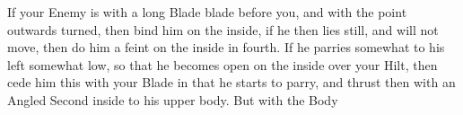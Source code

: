 
If your Enemy is with a long Blade blade before you, and with the
point outwards turned, then bind him on the inside, if he then lies
still, and will not move, then do him a feint on the inside in
fourth. If he parries somewhat to his left somewhat low, so that he
becomes open on the inside over your Hilt, then cede him this with
your Blade in that he starts to parry, and thrust then with an Angled
Second inside to his upper body. But with the Body
